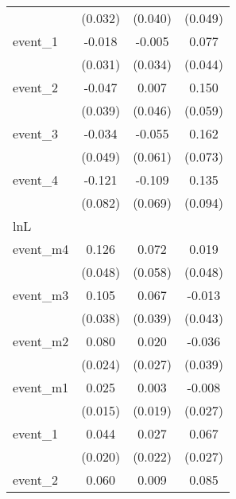 \begin{table}[htbp]
\begin{tabular}{l*{3}{c}}
            &     (0.032)         &     (0.040)         &     (0.049)         \\
[1em]
event\_1     &      -0.018         &      -0.005         &       0.077         \\
            &     (0.031)         &     (0.034)         &     (0.044)         \\
[1em]
event\_2     &      -0.047         &       0.007         &       0.150\sym{*}  \\
            &     (0.039)         &     (0.046)         &     (0.059)         \\
[1em]
event\_3     &      -0.034         &      -0.055         &       0.162\sym{*}  \\
            &     (0.049)         &     (0.061)         &     (0.073)         \\
[1em]
event\_4     &      -0.121         &      -0.109         &       0.135         \\
            &     (0.082)         &     (0.069)         &     (0.094)         \\
\hline
lnL         &                     &                     &                     \\
event\_m4    &       0.126\sym{**} &       0.072         &       0.019         \\
            &     (0.048)         &     (0.058)         &     (0.048)         \\
[1em]
event\_m3    &       0.105\sym{**} &       0.067         &      -0.013         \\
            &     (0.038)         &     (0.039)         &     (0.043)         \\
[1em]
event\_m2    &       0.080\sym{***}&       0.020         &      -0.036         \\
            &     (0.024)         &     (0.027)         &     (0.039)         \\
[1em]
event\_m1    &       0.025         &       0.003         &      -0.008         \\
            &     (0.015)         &     (0.019)         &     (0.027)         \\
[1em]
event\_1     &       0.044\sym{*}  &       0.027         &       0.067\sym{*}  \\
            &     (0.020)         &     (0.022)         &     (0.027)         \\
[1em]
event\_2     &       0.060         &       0.009         &       0.085\sym{*}  \\

\end{tabular}
\end{table}
